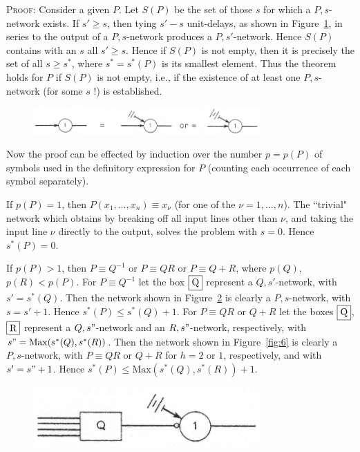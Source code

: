 \documentclass[twocolumn,preprintnumbers,amsmath,amssymb,floatfix]{revtex4}
\begin{document}
\noindent \textsc{Proof:} Consider a given $P$. Let $S(P)$ be the
set of those $s$ for which a $P,s$-network exists. If $s'\geq s$,
then tying $s'-s$ unit-delays, as shown in Figure~\ref{fig:4}, in
series to the output of a $P,s$-network produces a $P,s'$-network.
Hence $S(P)$ contains with an $s$ all $s'\geq s$. Hence if $S(P)$
is not empty, then it is precisely the set of all $s\geq s^*$,
where $s^*=s^*(P)$ is its smallest element. Thus the theorem holds
for $P$ if $S(P)$ is not empty, i.e., if the existence of at least
one $P,s$-network (for some $s$ !) is established.

\begin{figure}[b]
\includegraphics[width=3.4in]{fig_4}
\caption{\label{fig:4}}
\end{figure}

Now the proof can be effected by induction over the number
$p=p(P)$ of symbols used in the definitory expression for $P$
(counting each occurrence of each symbol separately).

If $p(P)=1$, then $P(x_1, \dots, x_n)\equiv x_\nu$ (for one of the
$\nu = 1, \dots, n$). The ``trivial" network which obtains by
breaking off all input lines other than $\nu$, and taking the
input line $\nu$ directly to the output, solves the problem with
$s=0$. Hence $s^*(P)=0$.

If $p(P)>1$, then $P\equiv Q^{-1}$ or $P \equiv QR$ or $P \equiv
Q+R$, where $p(Q)$, $p(R)<p(P)$. For $P\equiv Q^{-1}$ let the box
$\fbox{Q}$ represent a $Q,s'$-network, with $s'=s^*(Q)$. Then the
network shown in Figure~\ref{fig:5} is clearly a $P,s$-network,
with $s=s'+1$. Hence $s^*(P)\leq s^*(Q)+1$. For $P\equiv QR$ or
$Q+R$ let the boxes $\fbox{Q}$, $\fbox{R}$ represent a
$Q,s"$-network and an $R,s"$-network, respectively, with
$s"=\mathrm{Max}(s^*(Q),s^*(R))$. Then the network shown in
Figure~\ref{fig:6} is clearly a $P,s$-network, with $P\equiv QR$
or $Q+R$ for $h=2$ or $1$, respectively, and with $s'=s"+1$. Hence
$s^*(P)\leq \mathrm{Max}(s^*(Q), s^*(R))+1$.

\begin{figure}[t]
\includegraphics[width=3.4in]{fig_5}
\caption{\label{fig:5}}
\end{figure}
\end{document}

